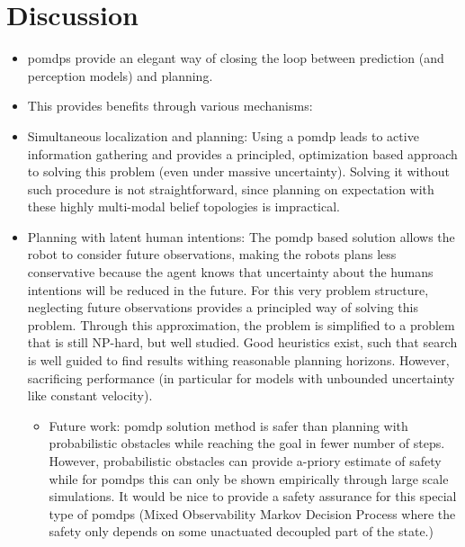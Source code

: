 \chapter{Discussion}\label{chap:discussion}

\begin{itemize}
  \item \acp{pomdp} provide an elegant way of closing the loop between
    prediction (and perception models) and planning.
  \item This provides benefits through various mechanisms:
  \item Simultaneous localization and planning: Using a \ac{pomdp} leads to active
    information gathering and provides a principled, optimization based
    approach to solving this problem (even under massive uncertainty). Solving
    it without such procedure is not straightforward, since planning on expectation
    with these highly multi-modal belief topologies is impractical.
  \item Planning with latent human intentions: The \ac{pomdp} based solution
    allows the robot to consider future observations, making the robots plans
    less conservative because the agent knows that uncertainty about the humans intentions
    will be reduced in the future. For this very problem structure, neglecting future observations
    provides a principled way of solving this problem. Through this
    approximation, the problem is simplified to a problem that is still
    NP-hard, but well studied. Good heuristics exist, such that search is well guided to find results
    withing reasonable planning horizons. However, sacrificing performance (in
    particular for models with unbounded uncertainty like constant velocity).
    \begin{itemize}
      \item Future work: \ac{pomdp} solution method is safer than planning with
      probabilistic obstacles while reaching the goal in fewer number of steps.
      However, probabilistic obstacles can provide a-priory estimate of safety
      while for \acp{pomdp} this can only be shown empirically through large
      scale simulations. It would be nice to provide a safety assurance for
      this special type of \acp{pomdp} (Mixed Observability Markov Decision
      Process where the safety only depends on some unactuated decoupled part
      of the state.)
    \end{itemize}
\end{itemize}
